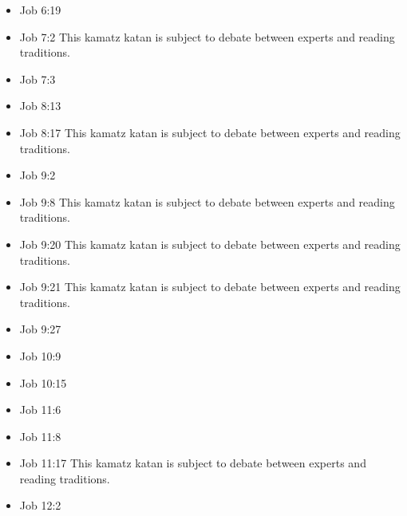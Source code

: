 \documentclass[14pt]{book}
\begin{document}
\begin{multicols}{2}
\begin{itemize}
									\item Job 6:19
									
									\item Job 7:2 This kamatz katan is subject to debate between experts and reading traditions.
									
									\item Job 7:3
									
									\item Job 8:13
									
									\item Job 8:17 This kamatz katan is subject to debate between experts and reading traditions.
									
									\item Job 9:2
									
									\item Job 9:8 This kamatz katan is subject to debate between experts and reading traditions.
									
									\item Job 9:20 This kamatz katan is subject to debate between experts and reading traditions.
									
									\item Job 9:21 This kamatz katan is subject to debate between experts and reading traditions.
									
									\item Job 9:27
									
									\item Job 10:9
									
									\item Job 10:15
									
									\item Job 11:6
											
											\item Job 11:8
											
											\item Job 11:17 This kamatz katan is subject to debate between experts and reading traditions.
											
											\item Job 12:2
											

\end{itemize}
\end{multicols}
\end{document}
